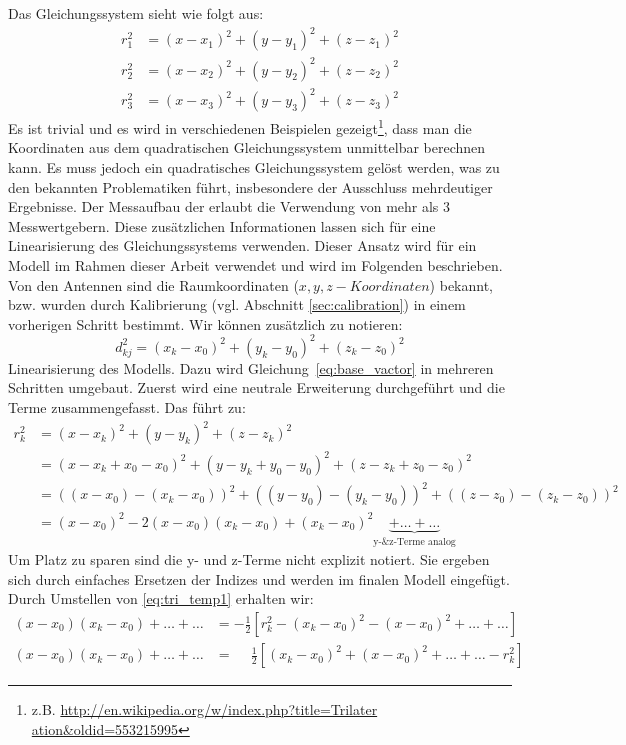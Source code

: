 %
Das Gleichungssystem sieht wie folgt aus:
%
\begin{align}
	r_{1}^2 &= (x-x_1)^2+(y-y_1)^2+(z-z_1)^2 \nonumber\\
	r_{2}^2 &= (x-x_2)^2+(y-y_2)^2+(z-z_2)^2 \nonumber\\
	r_{3}^2 &= (x-x_3)^2+(y-y_3)^2+(z-z_3)^2 \nonumber
%	
\end{align}
%
Es ist trivial und es wird in verschiedenen Beispielen gezeigt\footnote{z.B. \url{http://en.wikipedia.org/w/index.php?title=Trilater ation&oldid=553215995}}, dass man die Koordinaten aus dem quadratischen Gleichungssystem unmittelbar berechnen kann. Es muss jedoch ein quadratisches Gleichungssystem gelöst werden, was zu den bekannten Problematiken führt, insbesondere der Ausschluss mehrdeutiger Ergebnisse. Der Messaufbau der \amedogmbh erlaubt die Verwendung von mehr als 3 Messwertgebern. Diese zusätzlichen Informationen lassen sich für eine Linearisierung des Gleichungssystems verwenden. Dieser Ansatz wird für ein Modell im Rahmen dieser Arbeit verwendet und wird im Folgenden beschrieben.\\
%
Von den Antennen sind die Raumkoordinaten ($x,y,z-Koordinaten$) bekannt, bzw. wurden durch Kalibrierung (vgl. Abschnitt \ref{sec:calibration}) in einem vorherigen Schritt bestimmt. Wir können zusätzlich zu notieren: %
%
\begin{equation}\label{eq:d_k0}
	d_{kj}^2= (x_k-x_0)^2+(y_k-y_0)^2+(z_k-z_0)^2
\end{equation}
%
Linearisierung des Modells.
Dazu wird Gleichung~\ref{eq:base_vactor} in mehreren Schritten umgebaut. Zuerst wird eine neutrale Erweiterung durchgeführt und die Terme zusammengefasst. Das führt zu:
%
\begin{align}
	r_{k}^2 &= (x-x_k)^2+(y-y_k)^2+(z-z_k)^2 \nonumber \\
	&=(x-x_k+x_0-x_0)^2+(y-y_k+y_0-y_0)^2+(z-z_k+z_0-z_0)^2 \nonumber \\
	&=((x-x_0)-(x_k-x_0))^2+((y-y_0)-(y_k-y_0))^2+((z-z_0)-(z_k-z_0))^2 \nonumber \\ 
	&=(x-x_0)^2-2(x-x_0)(x_k-x_0)+(x_k-x_0)^2\underbrace{+\dots{}+\dots{}}_\text{y-\& z-Terme analog}
	\label{eq:tri_temp1}
%
\end{align}
%
Um Platz zu sparen sind die y- und z-Terme nicht explizit notiert. Sie ergeben sich durch einfaches Ersetzen der Indizes und werden im finalen Modell eingefügt. Durch Umstellen von \eqref{eq:tri_temp1} erhalten wir:
\begin{align}
(x-x_0)(x_k-x_0)+\dots{}+\dots{}&=-\frac{1}{2}[r_k^2-(x_k-x_0)^2 -(x-x_0)^2 +\dots{} +\dots{}]\nonumber\\
(x-x_0)(x_k-x_0)+\dots{}+\dots{}&=\phantom{-}\frac{1}{2}[(x_k-x_0)^2 +(x-x_0)^2 +\dots{}+\dots{}-r_k^2]\nonumber
%
\end{align}
